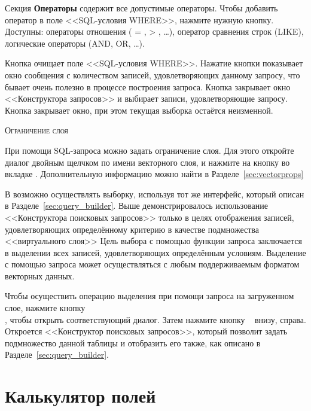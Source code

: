 Секция \textbf{Операторы} содержит все допустимые операторы. Чтобы добавить
оператор в поле <<SQL-условия WHERE>>, нажмите нужную кнопку. Доступны:
операторы отношения ( = , > , \ldots), оператор сравнения строк (LIKE),
логические операторы (AND, OR, \ldots).

Кнопка  очищает поле <<SQL-условия WHERE>>. Нажатие кнопки
 показывает окно сообщения с количеством записей,
удовлетворяющих данному запросу, что бывает очень полезно в процессе
построения запроса. Кнопка  закрывает окно <<Конструктора
запросов>> и выбирает записи, удовлетворяющие запросу. Кнопка
 закрывает окно, при этом текущая выборка остаётся
неизменной.

\begin{Tip}\caption{\textsc{Ограничение слоя}}
При помощи SQL-запроса можно задать ограничение слоя. Для этого откройте
диалог  двойным щелчком по имени векторного слоя,
и нажмите на кнопку  во вкладке .
Дополнительную информацию можно найти в Разделе~\ref{sec:vectorprops}
\end{Tip}

\label{sec:select_by_query}

В \qg возможно осуществлять выборку, используя тот же интерфейс,
который описан в Разделе~\ref{sec:query_builder}. Выше демонстрировалось
использование <<Конструктора поисковых запросов>> только в целях отображения
записей, удовлетворяющих определённому критерию в качестве подмножества
<<виртуального слоя>> Цель выбора с помощью функции запроса заключается
в выделении всех записей, удовлетворяющих определённым условиям. Выделение
с помощью запроса может осуществляться с любым поддерживаемым форматом
векторных данных.

Чтобы осуществить операцию выделения при помощи запроса на загруженном слое,
нажмите кнопку \\
, чтобы открыть
соответствующий диалог. Затем нажмите кнопку \
 внизу, справа. Откроется <<Конструктор поисковых
запросов>>, который позволит задать подмножество данной таблицы и отобразить
его также, как описано в Разделе~\ref{sec:query_builder}.

\section{Калькулятор полей}\label{sec:field_calculator}

